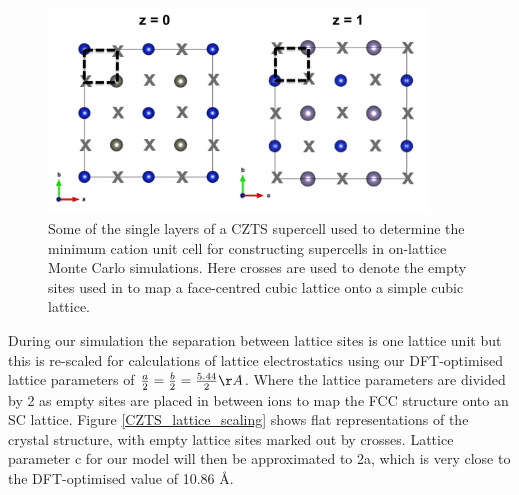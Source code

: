 \begin{figure}[h!]
  \centering
    \includegraphics[width=0.9\textwidth]{figures/unit_cell_eris_supercell.png}
    \caption{Some of the single layers of a CZTS supercell used to determine the minimum cation unit cell for constructing supercells in on-lattice Monte Carlo simulations. Here crosses are used to denote the empty sites used in to map a face-centred cubic lattice onto a simple cubic lattice.}
  \label{unit_cell_eris_supercell}
\end{figure}


During our simulation the separation between lattice sites is one lattice unit but this is re-scaled for calculations of lattice electrostatics using our DFT-optimised lattice parameters of $\frac{a}{2}  = \frac{b}{2} = \frac{5.44}{2} \AA$. Where the lattice parameters are divided by 2 as empty sites are placed in between ions to map the FCC structure onto an SC lattice. Figure \ref{CZTS_lattice_scaling} shows flat representations of the crystal structure, with empty lattice sites marked out by crosses. Lattice parameter c for our model will then be approximated to 2a, which is very close to the DFT-optimised value of 10.86 \AA .  

